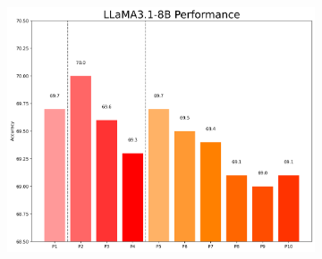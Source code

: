 \documentclass[11pt]{article}
\begin{document}
\begin{figure}[h]
    \begin{subfigure}[b]{0.3\linewidth}
        \centering
        \includegraphics[width=\linewidth]{picture/figure4_llama.png}
    \end{subfigure}
    

\end{figure}
\end{document}
